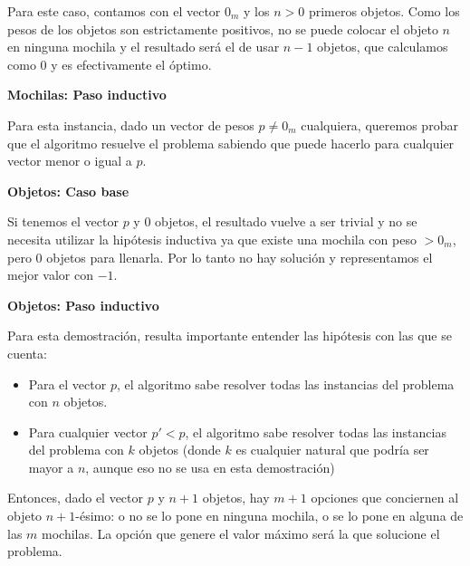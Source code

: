 Para este caso, contamos con el vector $0_m$ y los $n > 0$ primeros objetos. Como los pesos de los objetos son estrictamente positivos, no se puede colocar el objeto $n$ en ninguna mochila y el resultado será el de usar $n-1$ objetos, que calculamos como 0 y es efectivamente el óptimo.

\vspace{5mm}

{\Large\textbf{Mochilas: Paso inductivo}}

\vspace{5mm}

Para esta instancia, dado un vector de pesos $p \neq 0_m$ cualquiera, queremos probar que el algoritmo resuelve el problema sabiendo que puede hacerlo para cualquier vector menor o igual a $p$.

\vspace{5mm}

{\large\textbf{Objetos: Caso base}}

\vspace{5mm}

Si tenemos el vector $p$ y $0$ objetos, el resultado vuelve a ser trivial y no se necesita utilizar la hipótesis inductiva ya que existe una mochila con peso $> 0_m$, pero $0$ objetos para llenarla. Por lo tanto no hay solución y representamos el mejor valor con $-1$.

\vspace{5mm}

{\large\textbf{Objetos: Paso inductivo}}

\vspace{5mm}

Para esta demostración, resulta importante entender las hipótesis con las que se cuenta:

\begin{itemize}
\item Para el vector $p$, el algoritmo sabe resolver todas las instancias del problema con $n$ objetos.
\item Para cualquier vector $p' < p$, el algoritmo sabe resolver todas las instancias del problema con $k$ objetos (donde $k$ es cualquier natural que podría ser mayor a $n$, aunque eso no se usa en esta demostración)
\end{itemize}

Entonces, dado el vector $p$ y $n + 1$ objetos, hay $m + 1$ opciones que conciernen al objeto $n + 1$-ésimo: o no se lo pone en ninguna mochila, o se lo pone en alguna de las $m$ mochilas. La opción que genere el valor máximo será la que solucione el problema.

